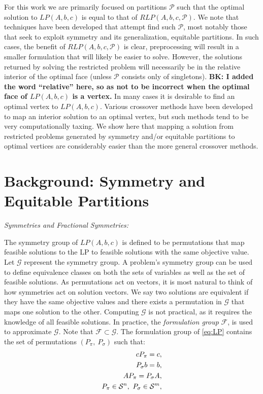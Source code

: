 \documentclass[runningheads]{llncs}
\newcommand{\cP}{{\mathcal P}}
\newcommand{\cF}{{\mathcal F}}
\newcommand{\cG}{{\mathcal G}}
\newcommand{\cS}{{\mathcal S}}
\begin{document}
For this work we are primarily focused on partitions $\cP$ such that the optimal
solution to $LP(A,b,c)$ is equal to that of $RLP(A,b,c,\cP)$. We note that
techniques have been developed that attempt find such $\cP$, most notably those
that seek to exploit symmetry and its generalization, equitable partitions. In
such cases, the benefit of  $RLP(A,b,c,\cP)$ is clear, preprocessing will result
in a smaller formulation that will likely be easier to solve. However, the
solutions returned by solving the restricted problem will necessarily be in the
relative interior of the optimal face (unless $\cP$ consists only of singletons). {\bf BK: I added the word ``relative'' here, so as not to be incorrect when the optimal face of $LP(A,b,c)$ is a vertex.} In many
cases it is desirable to find an optimal vertex to $LP(A,b,c)$. Various
crossover methods have been developed to map an interior solution to an optimal
vertex, but such methods tend to be very computationally taxing. We show here
that mapping a solution from restricted problems generated by symmetry and/or
equitable partitions to optimal vertices are
considerably easier than the more general crossover methods.


\section{Background: Symmetry and Equitable Partitions}

{\em Symmetries and Fractional Symmetries:}

The symmetry group of $LP(A,b,c)$ is defined to
be permutations that map feasible solutions to the LP to feasible solutions with
the same objective value. Let $\cG$ represent the symmetry group. A problem's
symmetry group can be used to define equivalence classes on both the sets of
variables as well as the set of feasible solutions. As permutations act on
vectors, it is most natural to think of how symmetries act on solution vectors.
We say two solutions are equivalent if they have the same objective values and there exists a permutation in $\cG$ that
maps one solution to the other. Computing $\cG$ is not practical, as it requires the knowledge of all feasible solutions. In practice, the {\em formulation group} $\cF$, is used to approximate $\cG$. Note that $\cF \subset \cG$. The formulation group of \eqref{eq:LP} contains the set of
	permutations  $(P_\pi,\ P_\sigma)$ such that:
	\begin{align}  \label{eq:formulation}
	c  P_\pi = c, \\ \notag
	P_\sigma b =b,\\ \notag
	A  P_\pi = P_\sigma A, \\ \notag
	P_\pi \in \cS^n,\ P_\sigma \in \cS^m,
	\end{align}
\end{document}
